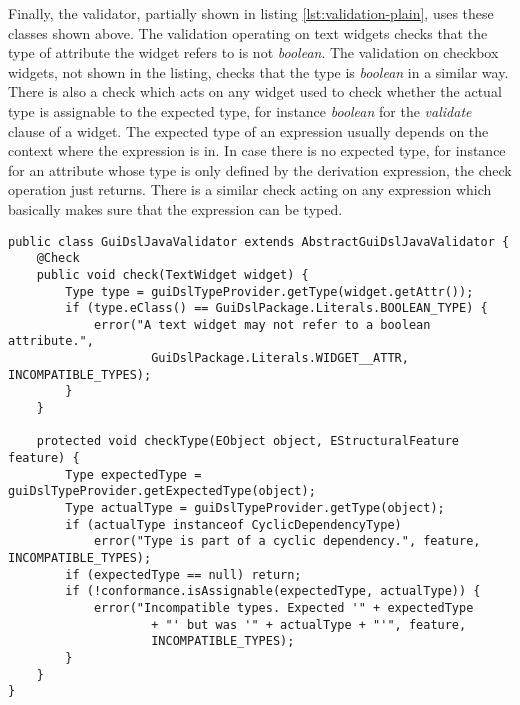 Finally, the validator, partially shown in listing \ref{lst:validation-plain},
uses these classes shown above.  The validation operating on text widgets checks that
the type of attribute the widget refers to is not \emph{boolean}.  The validation on
checkbox widgets, not shown in the listing, checks that the type is
\emph{boolean} in a similar way.
There is also a check which acts on any widget used to check whether the actual
type is assignable to the expected type, for instance \emph{boolean} for the
\emph{validate} clause of a widget. The expected type of an expression usually
depends on the context where the expression is in.
In case there is no expected type, for instance for an attribute whose type is
only defined by the derivation expression, the check operation just returns.
There is a similar check acting on any expression which basically makes sure
that the expression can be typed.

%

\begin{lstlisting}[float=tb,label=lst:validation-plain,caption=Xtext validator.] 
public class GuiDslJavaValidator extends AbstractGuiDslJavaValidator {
	@Check
	public void check(TextWidget widget) {
		Type type = guiDslTypeProvider.getType(widget.getAttr());
		if (type.eClass() == GuiDslPackage.Literals.BOOLEAN_TYPE) {
			error("A text widget may not refer to a boolean attribute.",
					GuiDslPackage.Literals.WIDGET__ATTR, INCOMPATIBLE_TYPES);
		}
	}

	protected void checkType(EObject object, EStructuralFeature feature) {
		Type expectedType = guiDslTypeProvider.getExpectedType(object);
		Type actualType = guiDslTypeProvider.getType(object);
		if (actualType instanceof CyclicDependencyType)
			error("Type is part of a cyclic dependency.", feature, INCOMPATIBLE_TYPES);
		if (expectedType == null) return;
		if (!conformance.isAssignable(expectedType, actualType)) {
			error("Incompatible types. Expected '" + expectedType
					+ "' but was '" + actualType + "'", feature,
					INCOMPATIBLE_TYPES);
		}
	}
}
\end{lstlisting}


%

